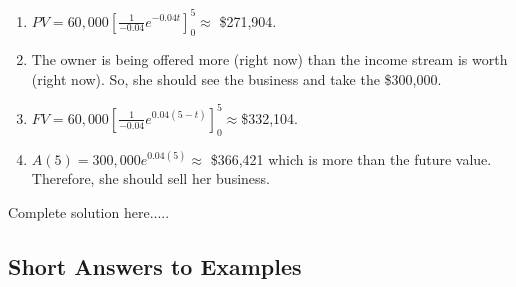 \begin{example}
    \begin{sol}
    \renewcommand{\labelenumi}{\textbf{(\alph{enumi})}}
    \begin{enumerate}[leftmargin=*]
    \item $PV=60,000\left[\displaystyle\frac{1}{-0.04}e^{-0.04t}\right]_0^{5}\approx$ \$271,904. 
    \item The owner is being offered more (right now) than the income stream is worth (right now). So, she should see the business and take the \$300,000.
    \item $FV=60,000\left[\displaystyle\frac{1}{-0.04}e^{0.04(5-t)}\right]_0^{5}\approx $\$332,104.
    \item $A(5)=300,000e^{0.04(5)}\approx$ \$366,421 which is more than the future value. Therefore, she should sell her business.
    \end{enumerate}
    \end{sol}
    \begin{solL}
    Complete solution here.....
    
    \end{solL}
    
\end{example}






\newpage
\subsection*{Short Answers to Examples}





